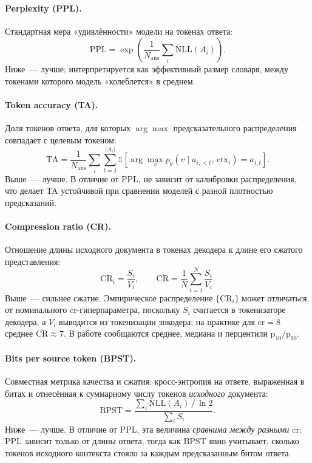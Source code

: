 \documentclass[a4paper,12pt]{extarticle}
\begin{document}
\paragraph{Perplexity (PPL).} Стандартная мера «удивлённости» модели на токенах ответа:
\begin{equation}
\label{eq:ppl}
    \mathrm{PPL} = \exp\!\left( \frac{1}{N_{\text{ans}}} \sum_{i} \mathrm{NLL}(A_i) \right).
\end{equation}
Ниже~--- лучше; интерпретируется как эффективный размер словаря, между токенами которого модель «колеблется» в среднем.

\paragraph{Token accuracy (TA).} Доля токенов ответа, для которых $\arg\max$ предсказательного распределения совпадает с целевым токеном:
\begin{equation}
\label{eq:tokacc}
    \mathrm{TA} = \frac{1}{N_{\text{ans}}} \sum_{i} \sum_{t=1}^{|A_i|} \mathbb{1}\!\left[\arg\max_{v} p_\theta\!\left(v \mid a_{i,<t},\, \text{ctx}_i\right) = a_{i,t}\right].
\end{equation}
Выше~--- лучше. В отличие от PPL, не зависит от калибровки распределения, что делает TA устойчивой при сравнении моделей с разной плотностью предсказаний.


\paragraph{Compression ratio (CR).} Отношение длины исходного документа в токенах декодера к длине его сжатого представления:
\begin{equation}
\label{eq:cr}
    \mathrm{CR}_i = \frac{S_i}{V_i}, \qquad
    \overline{\mathrm{CR}} = \frac{1}{N} \sum_{i=1}^{N} \frac{S_i}{V_i}.
\end{equation}
Выше~--- сильнее сжатие. Эмпирическое распределение $\{\mathrm{CR}_i\}$ может отличаться от номинального $\text{cr}$-гиперпараметра, поскольку $S_i$ считается в токенизаторе декодера, а $V_i$ выводится из токенизации энкодера; на практике для $\text{cr}=8$ среднее $\overline{\mathrm{CR}} \approx 7$. В работе сообщаются среднее, медиана и перцентили $\mathrm{p}_{10}/\mathrm{p}_{90}$.

\paragraph{Bits per source token (BPST).} Совместная метрика качества и сжатия: кросс-энтропия на ответе, выраженная в битах и отнесённая к суммарному числу токенов \emph{исходного} документа:
\begin{equation}
\label{eq:bpst}
    \mathrm{BPST} = \frac{\sum_{i} \mathrm{NLL}(A_i) \,/\, \ln 2}{\sum_{i} S_i}.
\end{equation}
Ниже~--- лучше. В отличие от PPL, эта величина \emph{сравнима между разными $\text{cr}$}: PPL зависит только от длины ответа, тогда как BPST явно учитывает, сколько токенов исходного контекста стояло за каждым предсказанным битом ответа.
\end{document}

